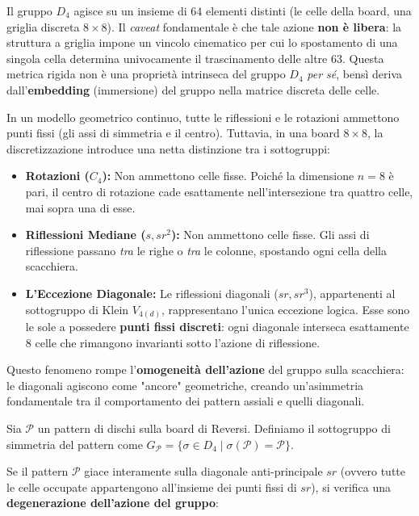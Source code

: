 Il gruppo $D_4$ agisce su un insieme di $64$ elementi distinti (le celle della board, una griglia discreta $8 \times 8$).
Il \textit{caveat} fondamentale è che tale azione \textbf{non è libera}: la struttura a griglia impone un vincolo cinematico per cui lo spostamento di una singola cella determina univocamente il trascinamento delle altre $63$. Questa metrica rigida non è una proprietà intrinseca del gruppo $D_4$ \textit{per sé}, bensì deriva dall'\textbf{embedding} (immersione) del gruppo nella matrice discreta delle celle.

In un modello geometrico continuo, tutte le riflessioni e le rotazioni ammettono punti fissi (gli assi di simmetria e il centro). Tuttavia, in una board $8 \times 8$, la discretizzazione introduce una netta distinzione tra i sottogruppi:

\begin{itemize}
    \item \textbf{Rotazioni ($C_4$):} Non ammettono celle fisse. Poiché la dimensione $n=8$ è pari, il centro di rotazione cade esattamente nell'intersezione tra quattro celle, mai sopra una di esse.
    \item \textbf{Riflessioni Mediane ($s, sr^2$):} Non ammettono celle fisse. Gli assi di riflessione passano \textit{tra} le righe o \textit{tra} le colonne, spostando ogni cella della scacchiera.
    \item \textbf{L'Eccezione Diagonale:} Le riflessioni diagonali ($sr, sr^3$), appartenenti al sottogruppo di Klein $V_{4(d)}$, rappresentano l'unica eccezione logica. Esse sono le sole a possedere \textbf{punti fissi discreti}: ogni diagonale interseca esattamente $8$ celle che rimangono invarianti sotto l'azione di riflessione.
\end{itemize}

Questo fenomeno rompe l'\textbf{omogeneità dell'azione} del gruppo sulla scacchiera: le diagonali agiscono come "ancore" geometriche, creando un'asimmetria fondamentale tra il comportamento dei pattern assiali e quelli diagonali.


Sia $\mathcal{P}$ un pattern di dischi sulla board di Reversi. Definiamo il sottogruppo di simmetria del pattern come $G_{\mathcal{P}} = \{ \sigma \in D_4 \mid \sigma(\mathcal{P}) = \mathcal{P} \}$.

Se il pattern $\mathcal{P}$ giace interamente sulla diagonale anti-principale $sr$ (ovvero tutte le celle occupate appartengono all'insieme dei punti fissi di $sr$), si verifica una \textbf{degenerazione dell'azione del gruppo}:

